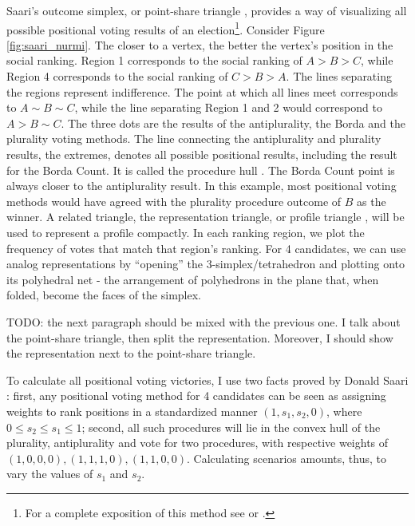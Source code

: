 \documentclass[hidelinks,11pt]{article} \usepackage[utf8]{inputenc}
\begin{document}
Saari's outcome simplex, or point-share triangle
\parencite{eggers20_diagr_analy_ordin_votin_system}, provides a way of
visualizing all possible positional voting results of an election\footnote{For a
complete exposition of this method see \textcite{saari1995basic} or
\textcite{nurmi2002voting}.}. Consider Figure \ref{fig:saari_nurmi}. The closer
to a vertex, the better the vertex's position in the social ranking. Region 1
corresponds to the social ranking of \(A > B > C\), while Region 4 corresponds
to the social ranking of \(C>B>A\). The lines separating the regions represent
indifference. The point at which all lines meet corresponds to
\(A \sim B \sim C\), while the line separating Region 1 and 2 would correspond
to \(A > B \sim C\). The three dots are the results of the antiplurality, the
Borda and the plurality voting methods. The line connecting the antiplurality
and plurality results, the extremes, denotes all possible positional results,
including the result for the Borda Count. It is called the procedure hull
\parencite{saari2001chaotic}. The Borda Count point is always closer to the
antiplurality result. In this example, most positional voting methods would have
agreed with the plurality procedure outcome of \(B\) as the winner. A related
triangle, the representation triangle, or profile triangle
\parencite{eggers20_diagr_analy_ordin_votin_system}, will be used to represent a
profile compactly. In each ranking region, we plot the frequency of votes that
match that region's ranking. For 4 candidates, we can use analog representations
by ``opening'' the 3-simplex/tetrahedron and plotting onto its polyhedral net -
the arrangement of polyhedrons in the plane that, when folded, become the faces
of the simplex.

TODO: the next paragraph should be mixed with the previous one. I talk about the point-share triangle, then split the representation. Moreover, I should show the representation next to the point-share triangle.

To calculate all positional voting victories, I use two facts proved by Donald
Saari \parencite{saari1995basic, saari2001chaotic}: first, any positional voting
method for 4 candidates can be seen as assigning weights to rank positions in a
standardized manner \((1,s_{1},s_{2},0)\), where
\(0 \leq s_{2} \leq s_{1} \leq 1\); second, all such procedures will lie in the
convex hull of the plurality, antiplurality and vote for two procedures, with
respective weights of \((1,0,0,0), (1,1,1,0), (1,1,0,0)\). Calculating scenarios
amounts, thus, to vary the values of \(s_{1}\) and \(s_{2}\).
\end{document}
